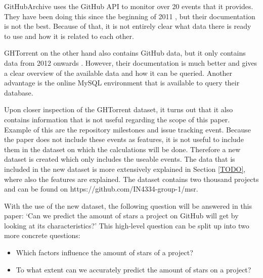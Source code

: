     GitHubArchive uses the GitHub API to monitor over 20 events \cite{TODO} that it provides. 
    They have been doing this since the beginning of 2011 \cite{TODO}, but their documentation is not the best.
    Because of that, it is not entirely clear what data there is ready to use and how it is related to each other.
    
    GHTorrent on the other hand also contains GitHub data, but it only contains data from 2012 onwards \cite{TODO}.
    However, their documentation is much better and gives a clear overview of the available data and how it can be queried.
    Another advantage is the online MySQL environment \cite{TODO} that is available to query their database.



    Upon closer inspection of the GHTorrent dataset, it turns out that it also contains information that is not useful regarding the scope of this paper. 
    Example of this are the repository milestones and issue tracking event.
    Because the paper does not include these events as features, it is not useful to include them in the dataset on which the calculations will be done. 
    Therefore a new dataset is created which only includes the useable events. 
    The data that is included in the new dataset is more extensively explained in Section \ref{TODO}, where also the features are explained.
    The dataset contains two thousand projects and can be found on  https://github.com/IN4334-group-1/msr.

    With the use of the new dataset, the following question will be answered in this paper: `Can we predict the amount of stars a project on GitHub will get by looking at its characteristics?'
    This high-level question can be split up into two more concrete questions:
    \begin{itemize}
        \item Which factors influence the amount of stars of a project?
        \item To what extent can we accurately predict the amount of stars on a project?
    \end{itemize}




